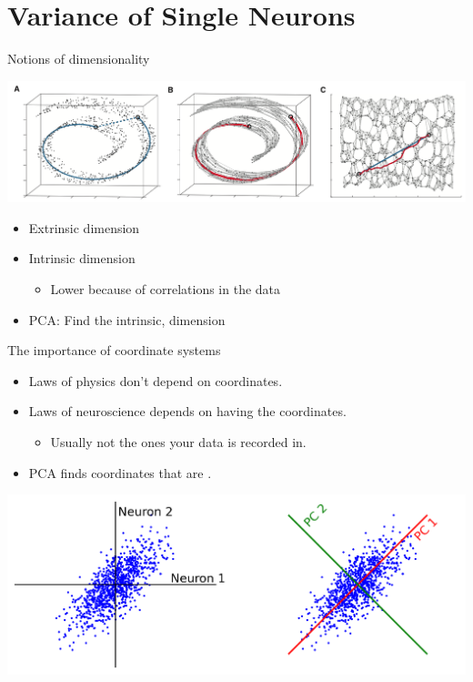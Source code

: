 \documentclass[presentation,smaller]{beamer}
\begin{document}
\section{Variance of Single Neurons}
\label{sec:org0371541}
\begin{frame}[label={sec:orgce30bfc}]{Notions of dimensionality}
\begin{center}
\includegraphics[width=1.0\textwidth]{figures/swiss_roll.png}
\end{center}  
\begin{itemize}
\item Extrinsic dimension
\item Intrinsic dimension
\begin{itemize}
\item Lower because of correlations in the data
\end{itemize}
\item PCA: Find the intrinsic,  dimension
\end{itemize}
\end{frame}
\begin{frame}[label={sec:orgae26422}]{The importance of coordinate systems}
\begin{itemize}
\item Laws of physics don't depend on coordinates.
\item Laws of neuroscience depends on having the  coordinates.
\begin{itemize}
\item Usually not the ones your data is recorded in.
\end{itemize}
\item PCA finds coordinates that are .
\end{itemize}
\begin{center}
\includegraphics[width=1.0\textwidth]{figures/pca_illustration.png}
\end{center}  
\end{frame}
\end{document}

